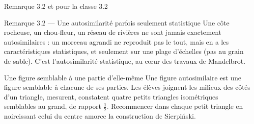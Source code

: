 \begin{frame}{Remarque 3.2 et pour la classe 3.2}
  \begin{Rem}{Remarque 3.2 --- Une autosimilarité parfois seulement statistique}
    \footnotesize Une côte rocheuse, un chou-fleur, un réseau de rivières
    ne sont jamais exactement autosimilaires : un morceau agrandi ne
    reproduit pas le tout, mais en a les caractéristiques statistiques,
    et seulement sur une plage d'échelles (pas au grain de sable). C'est
    l'autosimilarité statistique, au cœur des travaux de Mandelbrot.
  \end{Rem}
  \begin{Classe}{Une figure semblable à une partie d'elle-même}
    \footnotesize Une figure autosimilaire est une figure semblable à
    chacune de ses parties. Les élèves joignent les milieux des côtés
    d'un triangle, mesurent, constatent quatre petits triangles
    isométriques semblables au grand, de rapport $\tfrac12$. Recommencer
    dans chaque petit triangle en noircissant celui du centre amorce la
    construction de Sierpiński.
  \end{Classe}
\end{frame}
